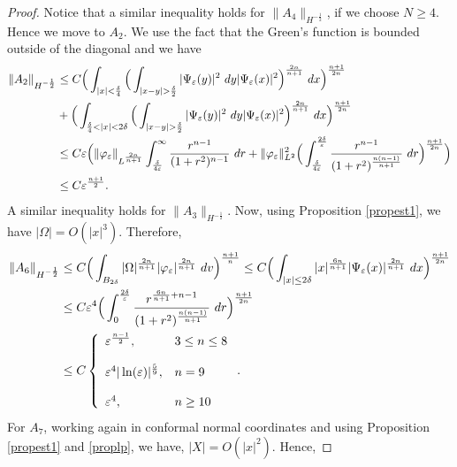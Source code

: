 \documentclass[11pt]{article}
\begin{document}
{\begin{proof}
\noindent
Notice that a similar inequality holds for $\|A_{4}\|_{H^{-\frac{1}{2}}}$, if we choose $N\geq 4$. Hence we move to $A_{2}$. We use the fact that the Green's function is bounded outside of the diagonal and we have
\begin{align}
\|A_{2}\|_{H^{-\frac{1}{2}}}&\leq C \Big(\int_{|x|<\frac{\delta}{4}}\Big(\int_{|x-y|>\frac{\delta}{2}}|\Psi_{\varepsilon}(y)|^{2}\ dy |\Psi_{\varepsilon}(x)|^{2}\Big)^{\frac{2n}{n+1}}\ dx \Big)^{\frac{n+1}{2n}}\notag\\
&+\Big(\int_{\frac{\delta}{4}<|x|<2\delta}\Big(\int_{|x-y|>\frac{\delta}{2}}|\Psi_{\varepsilon}(y)|^{2}\ dy |\Psi_{\varepsilon}(x)|^{2}\Big)^{\frac{2n}{n+1}}\ dx \Big)^{\frac{n+1}{2n}}\notag\\
&\leq C \varepsilon\Big( \|\varphi_{\varepsilon}\|_{L^{\frac{2n}{n+1}}}\int_{\frac{\delta}{4\varepsilon}}^{\infty}\frac{r^{n-1}}{(1+r^{2})^{n-1}}\ dr +\|\varphi_{\varepsilon}\|_{L^{2}}^{2}\Big(\int_{\frac{\delta}{4\varepsilon}}^{\frac{2\delta}{\varepsilon}} \frac{r^{n-1}}{(1+r^{2})^{\frac{n(n-1)}{n+1}}}\ dr \Big)^{\frac{n+1}{2n}}\Big)\notag\\
& \leq C \varepsilon^{\frac{n+1}{2}}.\notag
\end{align}
A similar inequality holds for $\|A_{3}\|_{H^{-\frac{1}{2}}}$. Now, using Proposition \ref{propest1}, we have $|\Omega|=O(|x|^{3})$. Therefore,
\begin{align}
\|A_{6}\|_{H^{-\frac{1}{2}}}&\leq C \Big(\int_{B_{2\delta}}|\Omega|^{\frac{2n}{n+1}}|\varphi_{\varepsilon}|^{\frac{2n}{n+1}}\ dv \Big)^{\frac{n+1}{n}} \leq C \Big( \int_{|x|\leq 2\delta} |x|^{\frac{6n}{n+1}}|\Psi_{\varepsilon}(x)|^{\frac{2n}{n+1}}\ dx\Big)^{\frac{n+1}{2n}} \notag\\
&\leq C \varepsilon^{4} \Big( \int_{0}^{\frac{2\delta}{\varepsilon}} \frac{r^{\frac{6n}{n+1}+n-1}}{(1+r^{2})^{\frac{n(n-1)}{n+1}}}\ dr \Big)^{\frac{n+1}{2n}}\notag\\
&\leq C \left\{\begin{array}{ll}
\varepsilon^{\frac{n-1}{2}}, & 3\leq n\leq 8\\
\\
\varepsilon^{4}|\ln(\varepsilon)|^{\frac{5}{9}}, & n=9\\
\\
\varepsilon^{4}, & n\geq 10
\end{array}
\right..\notag
\end{align}
For $A_{7}$, working again in conformal normal coordinates and using Proposition \ref{propest1} and \ref{proplp}, we have, $|X|=O(|x|^{2})$. Hence,

\end{proof}}
\end{document}
